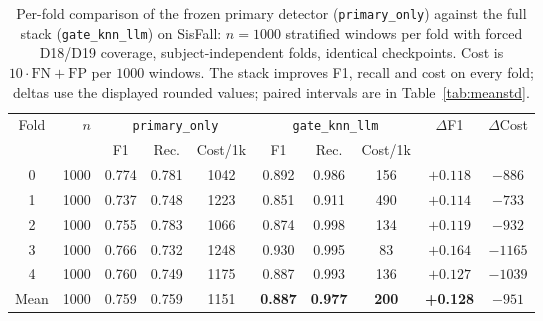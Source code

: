 \begin{table}[!t]
\centering
\caption{Per-fold comparison of the frozen primary detector (\texttt{primary\_only}) against the full stack (\texttt{gate\_knn\_llm}) on SisFall: $n{=}1000$ stratified windows per fold with forced D18/D19 coverage, subject-independent folds, identical checkpoints. Cost is $10\cdot\mathrm{FN}{+}\mathrm{FP}$ per $1000$ windows. The stack improves F1, recall and cost on every fold; deltas use the displayed rounded values; paired intervals are in Table~\ref{tab:meanstd}.}
\label{tab:perfold}
\begin{tabular}{c r ccc ccc cc}
\toprule
Fold & $n$ & \multicolumn{3}{c}{\texttt{primary\_only}} & \multicolumn{3}{c}{\texttt{gate\_knn\_llm}} & $\Delta$F1 & $\Delta$Cost \\
\cmidrule(lr){3-5}\cmidrule(lr){6-8}
 & & F1 & Rec. & Cost/1k & F1 & Rec. & Cost/1k & & \\
\midrule
0 & 1000 & 0.774 & 0.781 & 1042 & 0.892 & 0.986 & 156 & $+0.118$ & $-886$  \\
1 & 1000 & 0.737 & 0.748 & 1223 & 0.851 & 0.911 & 490 & $+0.114$ & $-733$  \\
2 & 1000 & 0.755 & 0.783 & 1066 & 0.874 & 0.998 & 134 & $+0.119$ & $-932$  \\
3 & 1000 & 0.766 & 0.732 & 1248 & 0.930 & 0.995 & 83  & $+0.164$ & $-1165$ \\
4 & 1000 & 0.760 & 0.749 & 1175 & 0.887 & 0.993 & 136 & $+0.127$ & $-1039$ \\
\midrule
Mean & 1000 & 0.759 & 0.759 & 1151 & \textbf{0.887} & \textbf{0.977} & \textbf{200} & \textbf{+0.128} & $-951$ \\
\bottomrule
\end{tabular}
\end{table}
